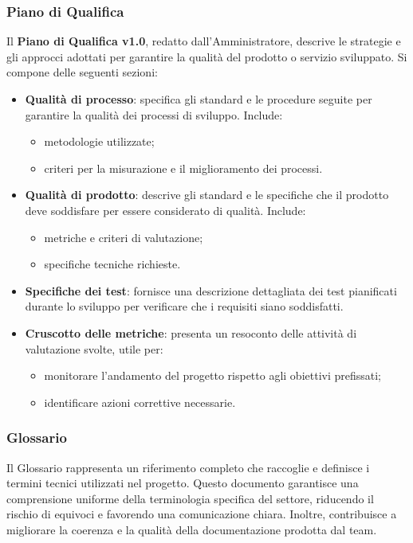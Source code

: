 \subsubsection{Piano di Qualifica}
Il \textbf{Piano di Qualifica v1.0}, redatto dall’Amministratore, descrive le strategie e gli approcci adottati per garantire la qualità del prodotto o servizio sviluppato. Si compone delle seguenti sezioni:
\begin{itemize}
    \item \textbf{Qualità di processo}: specifica gli standard e le procedure seguite per garantire la qualità dei processi di sviluppo. Include:
    \begin{itemize}
        \item metodologie utilizzate;
        \item criteri per la misurazione e il miglioramento dei processi.
    \end{itemize}

    \item \textbf{Qualità di prodotto}: descrive gli standard e le specifiche che il prodotto deve soddisfare per essere considerato di qualità. Include:
    \begin{itemize}
        \item metriche e criteri di valutazione;
        \item specifiche tecniche richieste.
    \end{itemize}

    \item \textbf{Specifiche dei test}: fornisce una descrizione dettagliata dei test pianificati durante lo sviluppo per verificare che i requisiti siano soddisfatti.

    \item \textbf{Cruscotto delle metriche}: presenta un resoconto delle attività di valutazione svolte, utile per:
    \begin{itemize}
        \item monitorare l’andamento del progetto rispetto agli obiettivi prefissati;
        \item identificare azioni correttive necessarie.
    \end{itemize}
\end{itemize}
\subsubsection{Glossario}
Il Glossario rappresenta un riferimento completo che raccoglie e definisce i termini tecnici utilizzati nel progetto. Questo documento garantisce una comprensione uniforme della terminologia specifica del settore, riducendo il rischio di equivoci e favorendo una comunicazione chiara. Inoltre, contribuisce a migliorare la coerenza e la qualità della documentazione prodotta dal team.

